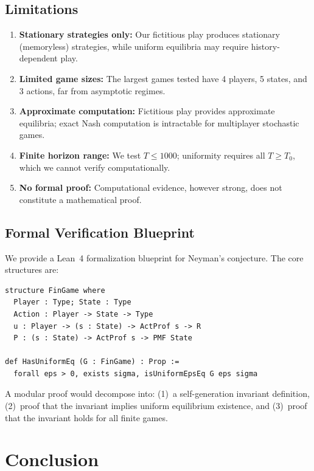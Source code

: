 \documentclass[11pt,a4paper]{article}
\theoremstyle{definition}
\begin{document}
\subsection{Limitations}

\begin{enumerate}[leftmargin=1.5em]
    \item \textbf{Stationary strategies only:} Our fictitious play produces stationary (memoryless) strategies, while uniform equilibria may require history-dependent play.
    \item \textbf{Limited game sizes:} The largest games tested have 4 players, 5 states, and 3 actions, far from asymptotic regimes.
    \item \textbf{Approximate computation:} Fictitious play provides approximate equilibria; exact Nash computation is intractable for multiplayer stochastic games.
    \item \textbf{Finite horizon range:} We test $T \leq 1000$; uniformity requires all $T \geq T_0$, which we cannot verify computationally.
    \item \textbf{No formal proof:} Computational evidence, however strong, does not constitute a mathematical proof.
\end{enumerate}

\subsection{Formal Verification Blueprint}

We provide a Lean~4 formalization blueprint for Neyman's conjecture.
The core structures are:

\begin{verbatim}
structure FinGame where
  Player : Type; State : Type
  Action : Player -> State -> Type
  u : Player -> (s : State) -> ActProf s -> R
  P : (s : State) -> ActProf s -> PMF State

def HasUniformEq (G : FinGame) : Prop :=
  forall eps > 0, exists sigma, isUniformEpsEq G eps sigma
\end{verbatim}

A modular proof would decompose into:
(1)~a self-generation invariant definition,
(2)~proof that the invariant implies uniform equilibrium existence, and
(3)~proof that the invariant holds for all finite games.

\section{Conclusion}\label{sec:conclusion}
\end{document}
